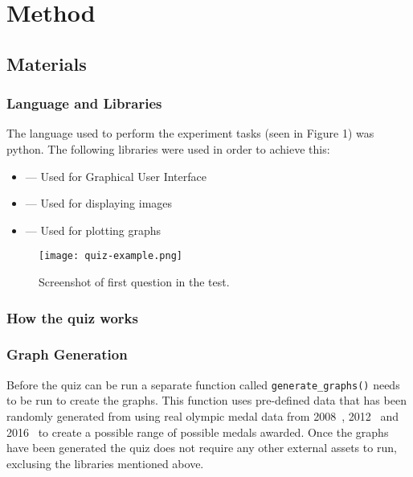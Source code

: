 \section{Method}


\subsection{Materials}
\subsubsection{Language and Libraries}
The language used to perform the experiment tasks (seen in Figure 1) was python. The following libraries were used in order to achieve this:
\begin{itemize}
    \setlength{\itemsep}{1pt}
	\setlength{\parskip}{0pt}
	\setlength{\parsep}{0pt}
    \item {} --- Used for Graphical User Interface
    \item {} --- Used for displaying images
    \item {} --- Used for plotting graphs
\end{itemize}
\begin{figure}[H]
    \centering
    \texttt{[image: quiz-example.png]}
    \caption{Screenshot of first question in the test.}
\end{figure}

\subsubsection{How the quiz works}
\subsubsection*{Graph Generation}
\begin{flushleft}
    Before the quiz can be run a separate function called \verb|generate_graphs()| needs to be run to create the graphs.
    This function uses pre-defined data that has been randomly generated from using real olympic medal data from
    2008~\cite{olympics2008}, 2012~\cite{olympics2012} and 2016~\cite{olympics2016} to create a possible range of possible medals awarded.
    Once the graphs have been generated the quiz does not require any other external assets to run, exclusing the libraries mentioned above.
\end{flushleft}
    
